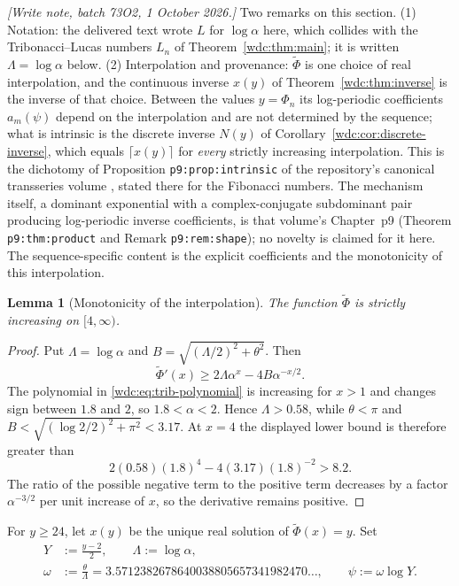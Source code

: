\documentclass[11pt,letterpaper]{article}
\numberwithin{equation}{section}
\newtheorem{lemma}[theorem]{Lemma}
\theoremstyle{definition}
\begin{document}
\emph{[Write note, batch 73O2, 1 October 2026.]} Two remarks on this
section. (1) Notation: the delivered text wrote $L$ for $\log\alpha$ here,
which collides with the Tribonacci--Lucas numbers $L_n$ of
Theorem~\ref{wdc:thm:main}; it is written $\Lambda=\log\alpha$ below.
(2) Interpolation and provenance: $\widetilde\Phi$ is one choice of real
interpolation, and the continuous inverse $x(y)$ of
Theorem~\ref{wdc:thm:inverse} is the inverse of that choice. Between the
values $y=\Phi_n$ its log-periodic coefficients $a_m(\psi)$ depend on the
interpolation and are not determined by the sequence; what is intrinsic is
the discrete inverse $N(y)$ of Corollary~\ref{wdc:cor:discrete-inverse}, which
equals $\lceil x(y)\rceil$ for \emph{every} strictly increasing interpolation.
This is the dichotomy of Proposition \texttt{p9:prop:intrinsic} of the
repository's canonical transseries volume \cite{tai}, stated there for the
Fibonacci numbers. The mechanism itself, a dominant exponential with a
complex-conjugate subdominant pair producing log-periodic inverse
coefficients, is that volume's Chapter~p9 (Theorem \texttt{p9:thm:product}
and Remark \texttt{p9:rem:shape}); no novelty is claimed for it here. The
sequence-specific content is the explicit coefficients and the monotonicity
of this interpolation.

\begin{lemma}[Monotonicity of the interpolation]\label{wdc:lem:interpolation-monotone}
The function $\widetilde\Phi$ is strictly increasing on $[4,\infty)$.
\end{lemma}

\begin{proof}
Put $\Lambda=\log\alpha$ and
$B=\sqrt{(\Lambda/2)^2+\theta^2}$.  Then
\[
 \widetilde\Phi'(x)
 \ge 2\Lambda\alpha^x-4B\alpha^{-x/2}.
\]
The polynomial in \eqref{wdc:eq:trib-polynomial} is increasing for $x>1$ and
changes sign between $1.8$ and $2$, so $1.8<\alpha<2$.  Hence
$\Lambda>0.58$, while $\theta<\pi$ and
$B<\sqrt{(\log 2/2)^2+\pi^2}<3.17$.  At $x=4$ the displayed lower bound is
therefore greater than
\[
  2(0.58)(1.8)^4-4(3.17)(1.8)^{-2}>8.2.
\]
The ratio of the possible negative term to the positive term decreases by a
factor $\alpha^{-3/2}$ per unit increase of $x$, so the derivative remains
positive.
\end{proof}

For $y\ge24$, let $x(y)$ be the unique real solution of
$\widetilde\Phi(x)=y$.  Set
\begin{align}\label{wdc:eq:inverse-variables}
  Y&:=\frac{y-2}{2},\qquad \Lambda :=\log\alpha,\\
  \omega&:=\frac{\theta}{\Lambda}
  =3.5712382678640038805657341982470\dots,
  \qquad \psi:=\omega\log Y.\nonumber
\end{align}
\end{document}
